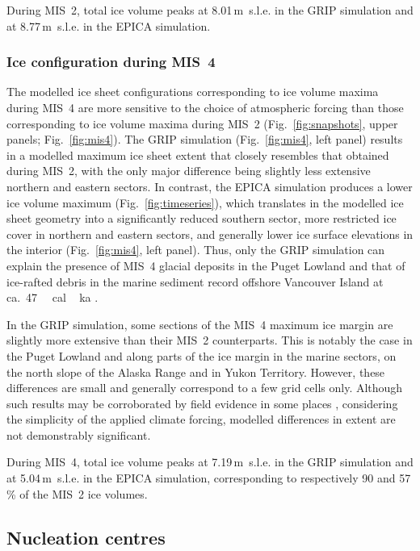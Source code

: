 \documentclass[tc]{copernicus}
\begin{document}
During MIS~2, total ice volume peaks at 8.01\,m~s.l.e. in the GRIP simulation
and at 8.77\,m~s.l.e. in the EPICA simulation.

\subsubsection{Ice configuration during MIS~4}
\label{sec:mis4}

The modelled ice sheet configurations corresponding to ice volume maxima during
MIS~4 are more sensitive to the choice of atmospheric forcing than those
corresponding to ice volume maxima during MIS~2 (Fig.~\ref{fig:snapshots},
upper panels;
Fig.~\ref{fig:mis4}). The GRIP simulation (Fig.~\ref{fig:mis4}, left panel)
results in a modelled maximum ice sheet extent that closely resembles that
obtained
during MIS~2, with the only major difference being slightly less extensive
northern and eastern sectors. In contrast, the EPICA simulation produces a lower
ice volume maximum (Fig.~\ref{fig:timeseries}), which translates in the
modelled ice sheet geometry into a significantly reduced southern sector, more
restricted ice cover in northern and eastern sectors, and generally lower
ice surface elevations in the interior (Fig.~\ref{fig:mis4}, left panel).
Thus, only the GRIP simulation can explain the presence of MIS~4 glacial
deposits in the Puget Lowland \citep{Troost.2014} and that of ice-rafted debris
in the marine sediment record offshore Vancouver Island at
ca.~47\,\unit{\,cal\,ka} \citep{Cosma.etal.2008}.

In the GRIP simulation, some sections of the MIS~4 maximum ice margin are
slightly more extensive than their MIS~2 counterparts. This is notably the case
in the Puget Lowland and along parts of the ice margin in the marine sectors,
on the north slope of the Alaska Range and in Yukon Territory. However, these
differences
are small and generally correspond to a few grid cells only. Although such
results may be corroborated by field evidence in some places
\citep[e.g.][]{Ward.etal.2007}, considering the simplicity of the applied
climate forcing, modelled differences in extent are not demonstrably
significant.

During MIS~4, total ice volume peaks at 7.19\,m~s.l.e. in the GRIP simulation
and at 5.04\,m~s.l.e. in the EPICA simulation, corresponding to respectively
90 and 57\,\% of the MIS~2 ice volumes.

\subsection{Nucleation centres}
\end{document}

